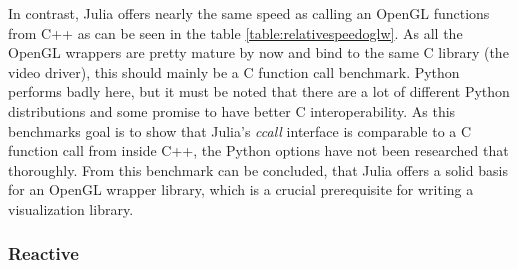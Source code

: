 In contrast, Julia offers nearly the same speed as calling an OpenGL functions from C++ as can be seen in the table \ref{table:relativespeedoglw}.
As all the OpenGL wrappers are pretty mature by now and bind to the same C library (the video driver), this should mainly be a C function call benchmark.
Python performs badly here, but it must be noted that there are a lot of different Python distributions and some promise to have better C interoperability.
As this benchmarks goal is to show that Julia’s \textit{ccall} interface is comparable to a C function call from inside C++, the Python options have not been researched that thoroughly.
From this benchmark can be concluded, that Julia offers a solid basis for an OpenGL wrapper library, which is a crucial prerequisite for writing a visualization library.

\subsubsection{Reactive}

